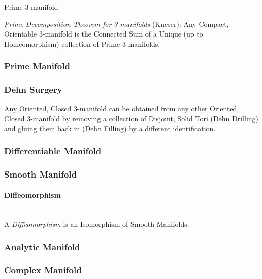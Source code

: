 Prime 3-manifold

\emph{Prime Decomposition Theorem for 3-manifolds} (Kneser): Any
Compact, Orientable 3-manifold is the Connected Sum of a Unique (up to
Homeomorphism) collection of Prime 3-manifolds.



\subsubsection{Prime Manifold}\label{sec:prime_manifold}



\subsubsection{Dehn Surgery}\label{sec:dehn_surgery}

Any Oriented, Closed 3-manifold can be obtained from any other
Oriented, Closed 3-manifold by removing a collection of Disjoint,
Solid Tori (Dehn Drilling) and gluing them back in (Dehn Filling) by a
different identification.



\subsubsection{Differentiable Manifold}
\label{sec:differentiable_manifold}

\subsubsection{Smooth Manifold}\label{sec:smooth_manifold}

\paragraph{Diffeomorphism}\label{sec:diffeomorphism}
\hfill \\
A \emph{Diffeomorphism} is an Isomorphism of Smooth Manifolds.



\subsubsection{Analytic Manifold}\label{sec:analytic_manifold}

\subsubsection{Complex Manifold}\label{sec:complex_manifold}


